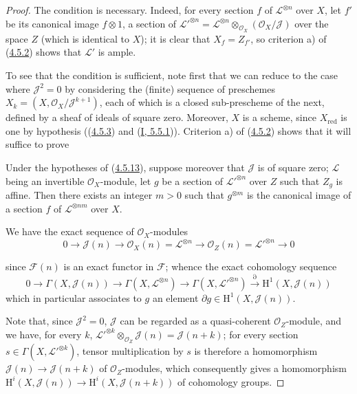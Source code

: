 \begin{proof}
The condition is necessary. Indeed, for every section $f$ of
$\mathcal{L}^{\otimes n}$ over $X$, let $f'$ be its canonical image
$f\otimes1$, a section of
$\mathcal{L}'^{\otimes n}=\mathcal{L}^{\otimes n}
\otimes_{\mathcal{O}_X}(\mathcal{O}_X/\mathcal{J})$ over the space
$Z$ (which is identical to $X$); it is clear that $X_f=Z_{f'}$, so
criterion a) of (\hyperref[II.4.5.2]{4.5.2}) shows that $\mathcal{L}'$ is
ample.

To see that the condition is sufficient, note first that we can
reduce to the case where $\mathcal{J}^2=0$ by considering the (finite) sequence of
preschemes
$X_k=(X,\mathcal{O}_X/\mathcal{J}^{k+1})$, each of which is a closed
sub-prescheme of the next, defined by a sheaf of ideals of square zero. Moreover,
$X$ is a scheme, since $X_{\mathrm{red}}$ is one by hypothesis
((\hyperref[II.4.5.3]{4.5.3}) and
(\hyperref[I.5.5.1]{I, 5.5.1})). Criterion a) of
(\hyperref[II.4.5.2]{4.5.2}) shows that it will suffice to prove

\begin{lemma}[4.5.13.1]
\label{II.4.5.13.1}
Under the hypotheses of (\hyperref[II.4.5.13]{4.5.13}), suppose moreover
that $\mathcal{J}$ is of square zero; $\mathcal{L}$ being an
invertible $\mathcal{O}_X$-module, let $g$ be a section of
$\mathcal{L}'^{\otimes n}$ over $Z$ such that $Z_g$ is affine.
Then there exists an integer $m>0$ such that $g^{\otimes m}$ is the
canonical image of a section $f$ of $\mathcal{L}^{\otimes nm}$ over $X$.
\end{lemma}

We have the exact sequence of $\mathcal{O}_X$-modules
\[
  0\longrightarrow\mathcal{J}(n)\longrightarrow
  \mathcal{O}_X(n)=\mathcal{L}^{\otimes n}\longrightarrow
  \mathcal{O}_Z(n)=\mathcal{L}'^{\otimes n}\longrightarrow0
\]


since $\mathcal{F}(n)$ is an exact functor in $\mathcal{F}$; whence the
exact cohomology sequence
\[
  0\longrightarrow\Gamma(X,\mathcal{J}(n))\longrightarrow
  \Gamma(X,\mathcal{L}^{\otimes n})\longrightarrow
  \Gamma(X,\mathcal{L}'^{\otimes n})\xrightarrow{\partial}
  \mathrm{H}^1(X,\mathcal{J}(n))
\]
which in particular associates to $g$ an element
$\partial g\in\mathrm{H}^1(X,\mathcal{J}(n))$.

Note that, since $\mathcal{J}^2=0$, $\mathcal{J}$ can be regarded
as a quasi-coherent $\mathcal{O}_Z$-module, and we have, for every $k$,
$\mathcal{L}'^{\otimes k}\otimes_{\mathcal{O}_Z}\mathcal{J}(n)
=\mathcal{J}(n+k)$; for every section
$s\in\Gamma(X,\mathcal{L}'^{\otimes k})$, tensor multiplication by
$s$ is therefore a homomorphism $\mathcal{J}(n)\to\mathcal{J}(n+k)$ of
$\mathcal{O}_Z$-modules, which consequently gives a homomorphism
$\mathrm{H}^i(X,\mathcal{J}(n))\to
\mathrm{H}^i(X,\mathcal{J}(n+k))$ of cohomology groups.


\end{proof}
